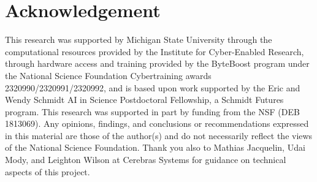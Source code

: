\section*{Acknowledgement}
{\footnotesize
This research was supported by Michigan State University through the computational resources provided by the Institute for Cyber-Enabled Research, through hardware access and training provided by the ByteBoost program under the National Science Foundation Cybertraining awards 2320990/2320991/2320992, and is based upon work supported by the Eric and Wendy Schmidt AI in Science Postdoctoral Fellowship, a Schmidt Futures program.
This research was supported in part by funding from the NSF (DEB 1813069).
Any opinions, findings, and conclusions or recommendations expressed in this material are those of the author(s) and do not necessarily reflect the views of the National Science Foundation.
Thank you also to Mathias Jacquelin, Udai Mody, and Leighton Wilson at Cerebras Systems for guidance on technical aspects of this project.
}
